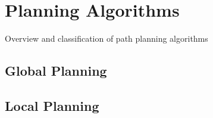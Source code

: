\chapter{Planning Algorithms}\label{ch:planningalgorithms}
Overview and classification of path planning algorithms

\section{Global Planning}\label{sec:global}

\section{Local Planning}\label{sec:local}





